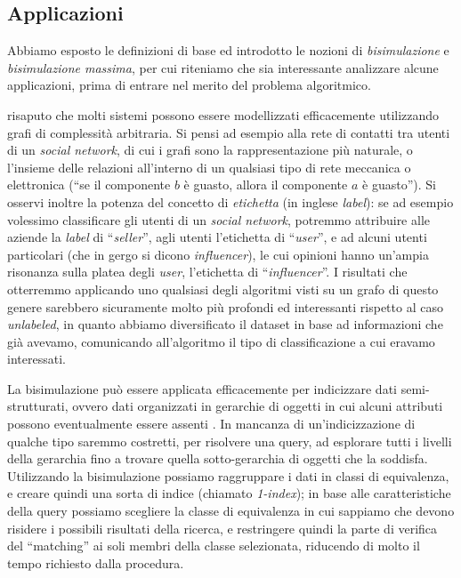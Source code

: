 \subsection{Applicazioni}
\label{sec:applications}
Abbiamo esposto le definizioni di base ed introdotto le nozioni di \emph{bisimulazione} e \emph{bisimulazione massima}, per cui riteniamo che sia interessante analizzare alcune applicazioni, prima di entrare nel merito del problema algoritmico.

\accente risaputo che molti sistemi possono essere modellizzati efficacemente utilizzando grafi di complessità arbitraria. Si pensi ad esempio alla rete di contatti tra utenti di un \emph{social network}, di cui i grafi sono la rappresentazione più naturale, o l'insieme delle relazioni all'interno di un qualsiasi tipo di rete meccanica o elettronica (``se il componente $b$ è guasto, allora il componente $a$ è guasto''). Si osservi inoltre la potenza del concetto di \emph{etichetta} (in inglese \emph{label}): se ad esempio volessimo classificare gli utenti di un \emph{social network}, potremmo attribuire alle aziende la \emph{label} di ``\emph{seller}'', agli utenti l'etichetta di ``\emph{user}'', e ad alcuni utenti particolari (che in gergo si dicono \emph{influencer}), le cui opinioni hanno un'ampia risonanza sulla platea degli \emph{user}, l'etichetta di ``\emph{influencer}''. I risultati che otterremmo applicando uno qualsiasi degli algoritmi visti su un grafo di questo genere sarebbero sicuramente molto più profondi ed interessanti rispetto al caso \emph{unlabeled}, in quanto abbiamo diversificato il dataset in base ad informazioni che già avevamo, comunicando all'algoritmo il tipo di classificazione a cui eravamo interessati.

La bisimulazione può essere applicata efficacemente per indicizzare dati semi-strutturati, ovvero dati organizzati in gerarchie di oggetti in cui alcuni attributi possono eventualmente essere assenti \cite{milo}. In mancanza di un'indicizzazione di qualche tipo saremmo costretti, per risolvere una query, ad esplorare tutti i livelli della gerarchia fino a trovare quella sotto-gerarchia di oggetti che la soddisfa. Utilizzando la bisimulazione possiamo raggruppare i dati in classi di equivalenza, e creare quindi una sorta di indice (chiamato \emph{1-index}); in base alle caratteristiche della query possiamo scegliere la classe di equivalenza in cui sappiamo che devono risidere i possibili risultati della ricerca, e restringere quindi la parte di verifica del ``matching'' ai soli membri della classe selezionata, riducendo di molto il tempo richiesto dalla procedura.

